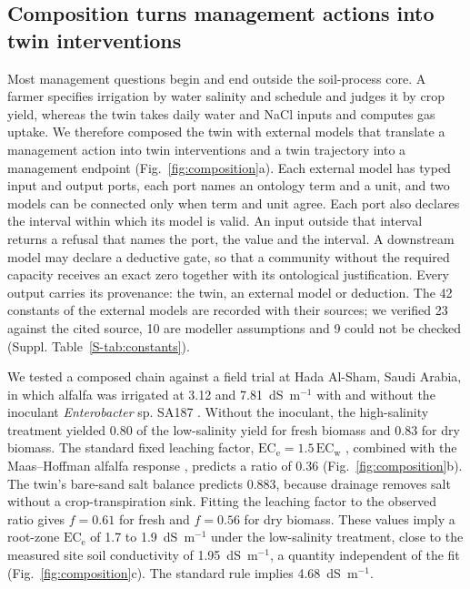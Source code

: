 \documentclass[11pt,a4paper]{article}
\begin{document}
\subsection{Composition turns management actions into twin interventions}
Most management questions begin and end outside the soil-process core. A farmer specifies irrigation by water salinity and schedule and judges it by crop yield, whereas the twin takes daily water and NaCl inputs and computes gas uptake. We therefore composed the twin with external models that translate a management action into twin interventions and a twin trajectory into a management endpoint (Fig.~\ref{fig:composition}a). Each external model has typed input and output ports, each port names an ontology term and a unit, and two models can be connected only when term and unit agree. Each port also declares the interval within which its model is valid. An input outside that interval returns a refusal that names the port, the value and the interval. A downstream model may declare a deductive gate, so that a community without the required capacity receives an exact zero together with its ontological justification. Every output carries its provenance: the twin, an external model or deduction. The 42 constants of the external models are recorded with their sources; we verified 23 against the cited source, 10 are modeller assumptions and 9 could not be checked (Suppl. Table~\ref{S-tab:constants}).

We tested a composed chain against a field trial at Hada Al-Sham, Saudi Arabia, in which alfalfa was irrigated at 3.12 and 7.81~dS~m$^{-1}$ with and without the inoculant \textit{Enterobacter} sp. SA187 \cite{dezelicourt2018sa187}. Without the inoculant, the high-salinity treatment yielded 0.80 of the low-salinity yield for fresh biomass and 0.83 for dry biomass. The standard fixed leaching factor, $\mathrm{EC_e}=1.5\,\mathrm{EC_w}$ \cite{ayers1985fao29}, combined with the Maas--Hoffman alfalfa response \cite{allen1998fao56}, predicts a ratio of 0.36 (Fig.~\ref{fig:composition}b). The twin's bare-sand salt balance predicts 0.883, because drainage removes salt without a crop-transpiration sink. Fitting the leaching factor to the observed ratio gives $f=0.61$ for fresh and $f=0.56$ for dry biomass. These values imply a root-zone $\mathrm{EC_e}$ of 1.7 to 1.9~dS~m$^{-1}$ under the low-salinity treatment, close to the measured site soil conductivity of 1.95~dS~m$^{-1}$, a quantity independent of the fit (Fig.~\ref{fig:composition}c). The standard rule implies 4.68~dS~m$^{-1}$.
\end{document}
